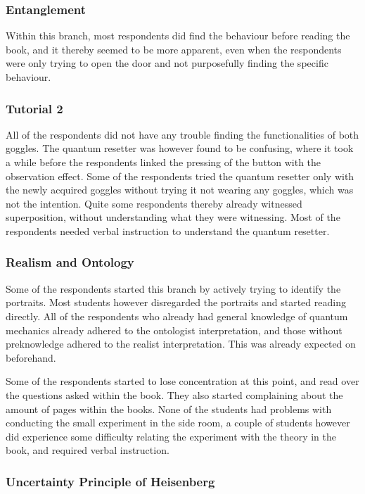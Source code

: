 \documentclass[11pt,twoside]{report} %
\begin{document}
\subsubsection{Entanglement}

Within this branch, most respondents did find the behaviour before reading the book, and it thereby seemed to be more apparent, even when the respondents were only trying to open the door and not purposefully finding the specific behaviour.

\subsubsection{Tutorial 2}

All of the respondents did not have any trouble finding the functionalities of both goggles. The quantum resetter was however found to be confusing, where it took a while before the respondents linked the pressing of the button with the observation effect. Some of the respondents tried the quantum resetter only with the newly acquired goggles without trying it not wearing any goggles, which was not the intention. Quite some respondents thereby already witnessed superposition, without understanding what they were witnessing. Most of the respondents needed verbal instruction to understand the quantum resetter.

\subsubsection{Realism and Ontology}

Some of the respondents started this branch by actively trying to identify the portraits. Most students however disregarded the portraits and started reading directly. All of the respondents who already had general knowledge of quantum mechanics already adhered to the ontologist interpretation, and those without preknowledge adhered to the realist interpretation. This was already expected on beforehand.

Some of the respondents started to lose concentration at this point, and read over the questions asked within the book. They also started complaining about the amount of pages within the books. None of the students had problems with conducting the small experiment in the side room, a couple of students however did experience some difficulty relating the experiment with the theory in the book, and required verbal instruction.

\subsubsection{Uncertainty Principle of Heisenberg}
\end{document}
